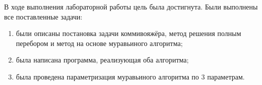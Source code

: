 
В ходе выполнения лабораторной работы цель была достигнута. Были выполнены все поставленные задачи:

\begin{enumerate}
	\item были описаны постановка задачи коммивояжёра, метод решения полным перебором и метод на основе муравьиного алгоритма;
	\item была написана программа, реализующая оба алгоритма;
	\item была проведена параметризация муравьиного алгоритма по 3 параметрам.
\end{enumerate}